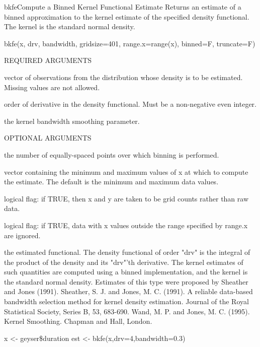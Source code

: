 \begin{Helpfile}{bkfe}{Compute a Binned Kernel Functional Estimate }
Returns an estimate of a binned approximation to
the kernel estimate of the specified density functional. 
The kernel is the standard normal density.
\begin{Example}
bkfe(x, drv, bandwidth, gridsize=401, range.x=range(x), binned=F, 
     truncate=F)
\end{Example}
\begin{Argument}{REQUIRED ARGUMENTS}
\item[\Co{x:}]
vector of observations from the distribution whose density is to
be estimated.
Missing values are not allowed.
\item[\Co{drv:}]
order of derivative in the density functional. Must be a
non-negative even integer.
\item[\Co{bandwidth:}]
the kernel bandwidth smoothing parameter.
\end{Argument}
\begin{Argument}{OPTIONAL ARGUMENTS}
\item[\Co{gridsize:}]
the number of equally-spaced points over which binning is
performed.
\item[\Co{range.x:}]
vector containing the minimum and maximum values of x
at which to compute the estimate.
The default is the minimum and maximum data values.
\item[\Co{binned:}]
logical flag: if TRUE, then x and y are taken to be grid counts
rather than raw data.
\item[\Co{truncate:}]
logical flag: if TRUE, data with x values outside the
range specified by range.x are ignored.
\end{Argument}
the estimated functional.
The density functional of order "drv" is the integral of the
product of the density and its "drv"'th derivative. 
The kernel estimates
of such quantities are computed using a binned implementation,
and the kernel is the standard normal density.
Estimates of this type were proposed by Sheather and
Jones (1991).
Sheather, S. J. and Jones, M. C. (1991).
A reliable data-based bandwidth selection method for
kernel density estimation.
Journal of the Royal Statistical Society, Series B, 53, 683-690.
Wand, M. P. and Jones, M. C. (1995).
Kernel Smoothing.
Chapman and Hall, London.
\need 15pt
\vspace{-16pt}
\begin{Example}
x <- geyser\$duration
est <- bkfe(x,drv=4,bandwidth=0.3)
\end{Example}
\end{Helpfile}
